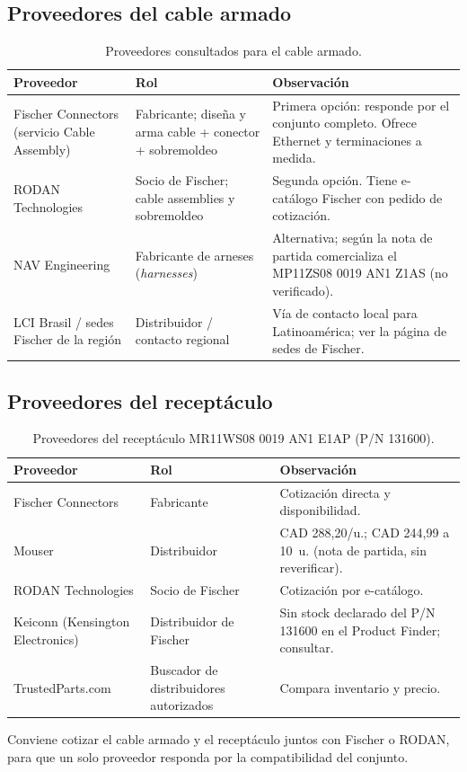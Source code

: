 \documentclass[11pt,a4paper]{article}
\begin{document}
\subsection{Proveedores del cable armado}
\begin{table}[H]\centering
  \caption{Proveedores consultados para el cable armado.}
  \begin{tabular}{p{3.6cm} p{4.4cm} p{6.2cm}}
    \toprule
    Proveedor & Rol & Observación \\
    \midrule
    Fischer Connectors (servicio Cable Assembly) & Fabricante; diseña y arma cable + conector + sobremoldeo & Primera opción: responde por el conjunto completo. Ofrece Ethernet y terminaciones a medida. \\
    RODAN Technologies & Socio de Fischer; cable assemblies y sobremoldeo & Segunda opción. Tiene e-catálogo Fischer con pedido de cotización. \\
    NAV Engineering & Fabricante de arneses (\emph{harnesses}) & Alternativa; según la nota de partida comercializa el MP11ZS08 0019 AN1 Z1AS (no verificado). \\
    LCI Brasil / sedes Fischer de la región & Distribuidor / contacto regional & Vía de contacto local para Latinoamérica; ver la página de sedes de Fischer. \\
    \bottomrule
  \end{tabular}
\end{table}

\subsection{Proveedores del receptáculo}
\begin{table}[H]\centering
  \caption{Proveedores del receptáculo MR11WS08 0019 AN1 E1AP (P/N 131600).}
  \begin{tabular}{p{3.6cm} p{4.4cm} p{6.2cm}}
    \toprule
    Proveedor & Rol & Observación \\
    \midrule
    Fischer Connectors & Fabricante & Cotización directa y disponibilidad. \\
    Mouser & Distribuidor & CAD 288,20/u.; CAD 244,99 a 10~u. (nota de partida, sin reverificar). \\
    RODAN Technologies & Socio de Fischer & Cotización por e-catálogo. \\
    Keiconn (Kensington Electronics) & Distribuidor de Fischer & Sin stock declarado del P/N 131600 en el Product Finder; consultar. \\
    TrustedParts.com & Buscador de distribuidores autorizados & Compara inventario y precio. \\
    \bottomrule
  \end{tabular}
\end{table}
Conviene cotizar el cable armado y el receptáculo juntos con Fischer o RODAN, para que un solo proveedor responda por la compatibilidad del conjunto.
\end{document}
